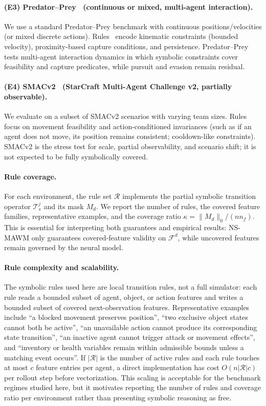 \documentclass{article}
\theoremstyle{plain}
\theoremstyle{definition}
\theoremstyle{remark}
\begin{document}
\paragraph{(E3) Predator--Prey~\cite{lowe2017multi} (continuous or mixed, multi-agent interaction).}
We use a standard Predator--Prey benchmark with continuous positions/velocities (or mixed discrete actions).
Rules~\hyperref[fn:github]{\footnotemark[1]} encode kinematic constraints (bounded velocity), proximity-based capture conditions, and persistence.
Predator--Prey tests multi-agent interaction dynamics in which symbolic constraints cover feasibility and capture predicates, while pursuit and evasion remain residual.

\paragraph{(E4) SMACv2~\cite{Ellis2023smacv2} (StarCraft Multi-Agent Challenge v2, partially observable).}
We evaluate on a subset of SMACv2 scenarios with varying team sizes.
Rules~\hyperref[fn:github]{\footnotemark[1]} focus on movement feasibility and action-conditioned invariances
(such as if an agent does not move, its position remains consistent; cooldown-like constraints).
SMACv2 is the stress test for scale, partial observability, and scenario shift; it is not expected to be fully symbolically covered.

\paragraph{Rule coverage.}
For each environment, the rule set $\mathcal{R}$ implements the partial symbolic transition operator $\mathcal{T}^j_s$ and its mask $M_d$. We report the number of rules, the covered feature families, representative examples, and the coverage ratio $\kappa=\|M_d\|_0/(n n_f)$. This is essential for interpreting both guarantees and empirical results: NS-MAWM only guarantees covered-feature validity on $\mathcal{F}^d$, while uncovered features remain governed by the neural model.

\paragraph{Rule complexity and scalability.}
The symbolic rules used here are local transition rules, not a full simulator: each rule reads a bounded subset of agent, object, or action features and writes a bounded subset of covered next-observation features. Representative examples include ``a blocked movement preserves position'', ``two exclusive object states cannot both be active'', ``an unavailable action cannot produce its corresponding state transition'', ``an inactive agent cannot trigger attack or movement effects'', and ``inventory or health variables remain within admissible bounds unless a matching event occurs''. If $|\mathcal{R}|$ is the number of active rules and each rule touches at most $c$ feature entries per agent, a direct implementation has cost $O(n|\mathcal{R}|c)$ per rollout step before vectorization. This scaling is acceptable for the benchmark regimes studied here, but it motivates reporting the number of rules and coverage ratio per environment rather than presenting symbolic reasoning as free.
\end{document}
